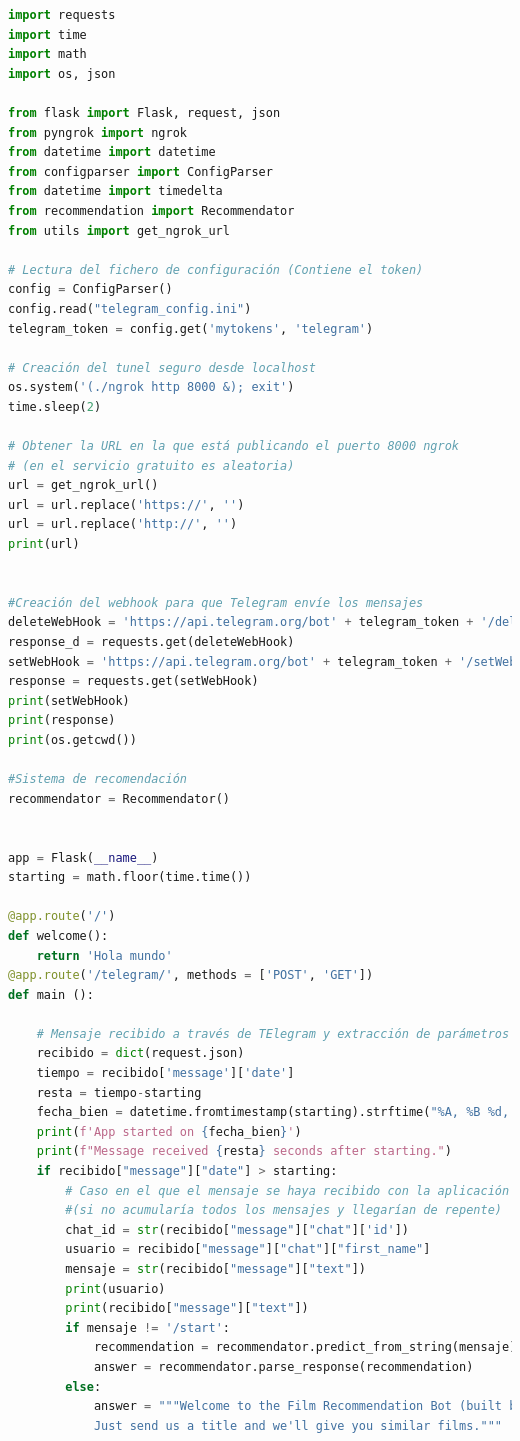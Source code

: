 \begin{lstlisting}[language=Python, label = {lst:API}, caption={Creación de la API del sistema de recomendación en Python usando Flask. En primer lugar se eliminan los posibles webhooks que existieran y se crea el nuevo con la URL a través de la cual pueda accederse a la API que estamos construyendo.}]
import requests
import time
import math
import os, json

from flask import Flask, request, json
from pyngrok import ngrok
from datetime import datetime
from configparser import ConfigParser
from datetime import timedelta
from recommendation import Recommendator
from utils import get_ngrok_url

# Lectura del fichero de configuración (Contiene el token)
config = ConfigParser()
config.read("telegram_config.ini")
telegram_token = config.get('mytokens', 'telegram')

# Creación del tunel seguro desde localhost
os.system('(./ngrok http 8000 &); exit')
time.sleep(2)

# Obtener la URL en la que está publicando el puerto 8000 ngrok
# (en el servicio gratuito es aleatoria)
url = get_ngrok_url()
url = url.replace('https://', '')
url = url.replace('http://', '')
print(url)


#Creación del webhook para que Telegram envíe los mensajes
deleteWebHook = 'https://api.telegram.org/bot' + telegram_token + '/deleteWebHook'
response_d = requests.get(deleteWebHook)
setWebHook = 'https://api.telegram.org/bot' + telegram_token + '/setWebHook?url=' + url+'/telegram/'
response = requests.get(setWebHook)
print(setWebHook)
print(response)
print(os.getcwd())

#Sistema de recomendación
recommendator = Recommendator()


app = Flask(__name__)
starting = math.floor(time.time())

@app.route('/')
def welcome():
    return 'Hola mundo'
@app.route('/telegram/', methods = ['POST', 'GET'])
def main ():
    
    # Mensaje recibido a través de TElegram y extracción de parámetros importantes
    recibido = dict(request.json)
    tiempo = recibido['message']['date']
    resta = tiempo-starting
    fecha_bien = datetime.fromtimestamp(starting).strftime("%A, %B %d, %Y %I:%M:%S")
    print(f'App started on {fecha_bien}')
    print(f"Message received {resta} seconds after starting.")
    if recibido["message"]["date"] > starting:
        # Caso en el que el mensaje se haya recibido con la aplicación operativa
        #(si no acumularía todos los mensajes y llegarían de repente)
        chat_id = str(recibido["message"]["chat"]['id'])
        usuario = recibido["message"]["chat"]["first_name"]
        mensaje = str(recibido["message"]["text"])
        print(usuario)
        print(recibido["message"]["text"])
        if mensaje != '/start':
            recommendation = recommendator.predict_from_string(mensaje)
            answer = recommendator.parse_response(recommendation)
        else:
            answer = """Welcome to the Film Recommendation Bot (built by Gonzalo Izaguirre).\n
            Just send us a title and we'll give you similar films."""
        

\end{lstlisting}
